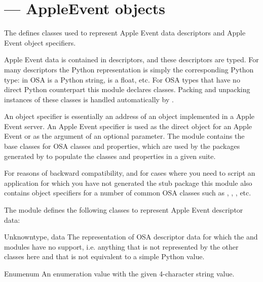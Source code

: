 \section{ ---
         AppleEvent objects}



The  defines classes used to represent Apple Event data
descriptors and Apple Event object specifiers.

Apple Event data is contained in descriptors, and these descriptors
are typed. For many descriptors the Python representation is simply the
corresponding Python type:  in OSA is a Python string,
 is a float, etc. For OSA types that have no direct
Python counterpart this module declares classes. Packing and unpacking
instances of these classes is handled automatically by .

An object specifier is essentially an address of an object implemented
in a Apple Event server. An Apple Event specifier is used as the direct
object for an Apple Event or as the argument of an optional parameter.
The  module contains the base classes for OSA classes
and properties, which are used by the packages generated by
 to populate the classes and properties in a
given suite.

For reasons of backward compatibility, and for cases where you need to
script an application for which you have not generated the stub package
this module also contains object specifiers for a number of common OSA
classes such as , , , etc.



The  module defines the following classes to represent
Apple Event descriptor data:

\begin{classdesc}{Unknown}{type, data}
The representation of OSA descriptor data for which the 
and  modules have no support, i.e. anything that is not
represented by the other classes here and that is not equivalent to a
simple Python value.
\end{classdesc}

\begin{classdesc}{Enum}{enum}
An enumeration value with the given 4-character string value.
\end{classdesc}


